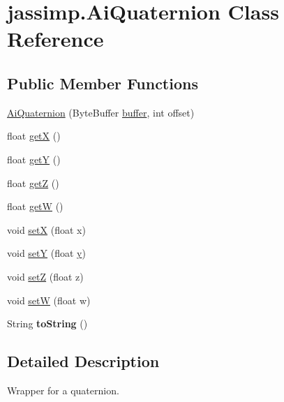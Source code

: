 \hypertarget{classjassimp_1_1_ai_quaternion}{\section{jassimp.\+Ai\+Quaternion Class Reference}
\label{classjassimp_1_1_ai_quaternion}
}
\subsection*{Public Member Functions}
\begin{DoxyCompactItemize}
\item 
\hyperlink{classjassimp_1_1_ai_quaternion_a19906c840914b13db54c8f831e63556d}{Ai\+Quaternion} (Byte\+Buffer \hyperlink{structbuffer}{buffer}, int offset)
\item 
float \hyperlink{classjassimp_1_1_ai_quaternion_a7a7b7d4378b72a3e2d6dca4c01c05331}{get\+X} ()
\item 
float \hyperlink{classjassimp_1_1_ai_quaternion_ab7ccd06752ab6f6f8efa489e39bb6c05}{get\+Y} ()
\item 
float \hyperlink{classjassimp_1_1_ai_quaternion_a791c5eb44980e446ebed94508f182bed}{get\+Z} ()
\item 
float \hyperlink{classjassimp_1_1_ai_quaternion_ae9a377a8a6640cc474f811d7c030fa62}{get\+W} ()
\item 
void \hyperlink{classjassimp_1_1_ai_quaternion_a4d9eba8595cf62ccb3857a8f75fdf104}{set\+X} (float x)
\item 
void \hyperlink{classjassimp_1_1_ai_quaternion_a08040e5cc51c9b21330e9d8c56a23926}{set\+Y} (float \hyperlink{_ice_utils_8h_aa7ffaed69623192258fb8679569ff9ba}{y})
\item 
void \hyperlink{classjassimp_1_1_ai_quaternion_a59cade6d7e0981d60197a0ca62689dcc}{set\+Z} (float z)
\item 
void \hyperlink{classjassimp_1_1_ai_quaternion_a2efa947d92d2b9855b72e309b534b4f5}{set\+W} (float w)
\item 
\hypertarget{classjassimp_1_1_ai_quaternion_a7daeb07b45fdb4cd1ce3ac402b9526c8}{String {\bfseries to\+String} ()}\label{classjassimp_1_1_ai_quaternion_a7daeb07b45fdb4cd1ce3ac402b9526c8}

\end{DoxyCompactItemize}


\subsection{Detailed Description}
Wrapper for a quaternion.

